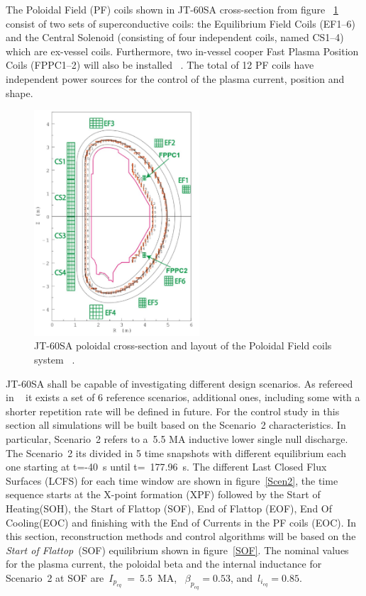 The Poloidal Field (PF) coils shown in JT-60SA cross-section from figure ~\ref{JT60coils} consist of two sets of superconductive coils: the Equilibrium Field Coils (EF1–6) and the Central Solenoid (consisting of four independent coils, named CS1–4) which are ex-vessel coils. Furthermore, two in-vessel cooper Fast Plasma Position  Coils (FPPC1–2) will also be installed ~\cite{NCruz}. The total of 12 PF coils have independent power sources for the control of the plasma current, position and shape.   
\smallskip

\begin{figure}
	\centering
	\includegraphics[width=0.55\textwidth]{Chp3/JT60Coils.png}

	\caption{	\label{JT60coils}JT-60SA poloidal cross-section and layout of the Poloidal Field coils system ~\cite{NCruz}.}
\end{figure}

JT-60SA shall be capable of investigating different design scenarios. As refereed  in 
~\cite{JT60SA:PID} it exists a set of 6 reference scenarios, additional ones, including some with a shorter repetition rate will be defined in future. For the control study in this section all simulations will be built based on the Scenario~2 characteristics. In particular, Scenario~2 refers to a~5.5 MA inductive lower single null discharge. The Scenario~2 its divided in 5 time snapshots with different equilibrium each one starting at  t=-40~s until t=~177.96~s. The different Last Closed Flux Surfaces (LCFS) for each time window are shown in figure~\ref{Scen2}, the time sequence starts at the X-point formation (XPF)	followed by the Start of Heating(SOH), the Start of Flattop (SOF), End of Flattop (EOF), End Of Cooling(EOC) and finishing with the End of Currents in the PF coils (EOC). In this section, reconstruction methods and control algorithms will be based on the \emph{Start of Flattop}~(SOF) equilibrium shown in figure~\ref{SOF}. The nominal values for the plasma current, the poloidal beta and the internal inductance for Scenario~2 at SOF are~$I_{p_{eq}}~=~5.5$~MA,~ $\beta_{p_{eq}}=0.53$, and~$l_{i_{eq}}=0.85$.\smallskip

